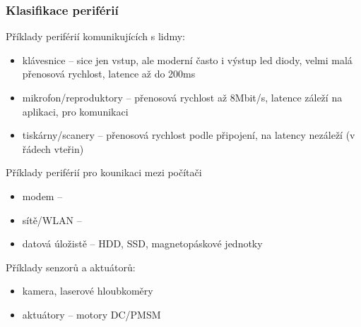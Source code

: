 \documentclass{beamer}
\begin{document}
\begin{frame}
\frametitle{Klasifikace periférií}
Příklady periférií komunikujících s lidmy:
\begin{itemize}
\item klávesnice -- sice jen vstup, ale moderní často i výstup led diody, velmi malá přenosová rychlost, latence až do 200ms 
\item mikrofon/reproduktory -- přenosová rychlost až 8Mbit/s, latence záleží na aplikaci, pro komunikaci
\item tiskárny/scanery -- přenosová rychlost podle připojení, na latency nezáleží (v řádech vteřin)
\end{itemize}

Příklady periférií pro kounikaci mezi počítači
\begin{itemize}
\item modem -- 
\item sítě/WLAN -- 
\item datová úložistě -- HDD, SSD, magnetopáskové jednotky
\end{itemize}

Příklady senzorů a aktuátorů:
\begin{itemize}
\item kamera, laserové hloubkoměry
\item aktuátory -- motory DC/PMSM 
\end{itemize}
\end{frame}
\end{document}
